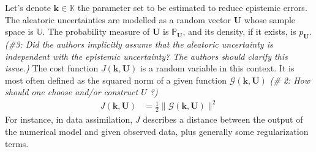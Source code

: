 \documentclass[preprint, review, 1p]{elsarticle}
\DeclareMathOperator*{\argmin}{arg\,min \,}
\newcommand{\Prob}{\mathbb{P}}
\newcommand{\kest}{\hat{\mathbf{k}}}
\newcommand{\Kspace}{\mathbb{K}}
\newcommand{\Uspace}{\mathbb{U}}
\newcommand{\arthur}[1]{{\itshape\color{cyan} ({#1})}}
\newcommand{\elise}[1]{{\itshape\color{red} ({#1})}}
\newcommand{\victor}[1]{{\itshape\color{green} ({#1})}}
\begin{document}


Let's denote $\mathbf{k} \in \Kspace$ the parameter set to be estimated to reduce epistemic errors. The aleatoric uncertainties are modelled as a random vector $\mathbf{U}$ whose sample space is $\Uspace$. The probability measure of $\mathbf{U}$ is $\Prob_{\mathbf{U}}$, and its density, if it exists, is $p_{\mathbf{U}}$. \victor{\#3: Did the authors implicitly assume that the aleatoric uncertainty is independent with the epistemic uncertainty? The authors should clarify this issue.}%
%
The cost function $J(\mathbf{k}, \mathbf{U})$ is a random variable in this context. %
It is most often defined as the squared norm of a given function $\mathcal{G}(\mathbf{k}, \mathbf{U})$%
\victor{\# 2: How should one choose and/or construct $U$ ?}
\begin{align}
  \label{eq:def_cost_fun}
  J(\mathbf{k},\mathbf{U}) & = \frac12\|\mathcal{G}(\mathbf{k}, \mathbf{U})\|^2
  \end{align}
For instance, in data assimilation, $J$ describes a distance between the output of the numerical model and given observed data, plus generally some regularization terms.
%
\end{document}
